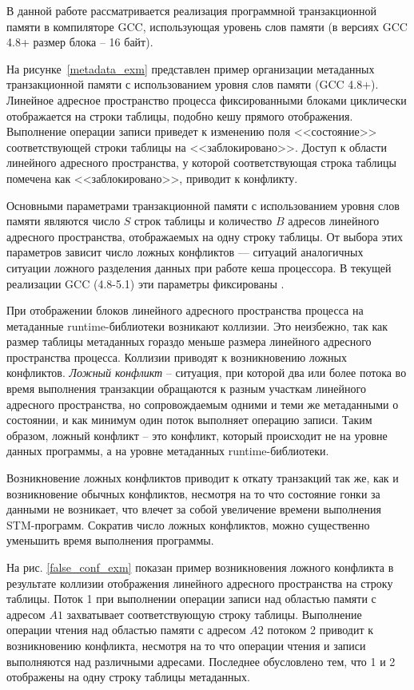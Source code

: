 В данной работе рассматривается реализация программной транзакционной памяти в компиляторе GCC, использующая уровень слов памяти (в версиях GCC 4.8+ размер блока – 16 байт).

На рисунке~\ref{metadata_exm} представлен пример организации метаданных транзакционной памяти с использованием уровня слов памяти (GCC 4.8+). Линейное адресное пространство процесса фиксированными блоками циклически отображается на строки таблицы, подобно кешу прямого отображения. Выполнение операции записи приведет к изменению поля <<состояние>> соответствующей строки таблицы на <<заблокировано>>. Доступ к области линейного адресного пространства, у которой соответствующая строка таблицы помечена как <<заблокировано>>, приводит к конфликту.

\todo {
}

Основными параметрами транзакционной памяти с использованием уровня слов памяти являются число $S$ строк таблицы и количество $B$ адресов линейного адресного пространства, отображаемых на одну строку таблицы. От выбора этих параметров зависит число ложных конфликтов --- ситуаций аналогичных ситуации ложного разделения данных при работе кеша процессора. В текущей реализации GCC (4.8-5.1) эти параметры фиксированы \cite{felber_fetzen_riegel_dynamic_performance_tuning}. 

При отображении блоков линейного адресного пространства процесса на метаданные runtime-библиотеки возникают коллизии. Это неизбежно, так как размер таблицы метаданных гораздо меньше размера линейного адресного пространства процесса. Коллизии приводят к возникновению ложных конфликтов. \textit{Ложный конфликт} -- ситуация, при которой два или более потока во время выполнения транзакции обращаются к разным участкам линейного адресного пространства, но сопровождаемым одними и теми же метаданными о состоянии, и как минимум один поток выполняет операцию записи. Таким образом, ложный конфликт -- это конфликт, который происходит не на уровне данных программы, а на уровне метаданных runtime-библиотеки.

Возникновение ложных конфликтов приводит к откату транзакций так же, как и возникновение обычных конфликтов, несмотря на то что состояние гонки за данными не возникает, что влечет за собой увеличение времени выполнения STM-программ. Сократив число ложных конфликтов, можно существенно уменьшить время выполнения программы.

На рис. \ref{false_conf_exm} показан пример возникновения ложного конфликта в результате коллизии отображения линейного адресного пространства на строку таблицы. Поток 1 при выполнении операции записи над областью памяти с адресом $A1$ захватывает соответствующую строку таблицы. Выполнение операции чтения над областью памяти с адресом $A2$ потоком 2 приводит к возникновению конфликта, несмотря на то что операции чтения и записи выполняются над различными адресами. Последнее обусловлено тем, что 1 и 2 отображены на одну строку таблицы метаданных.

